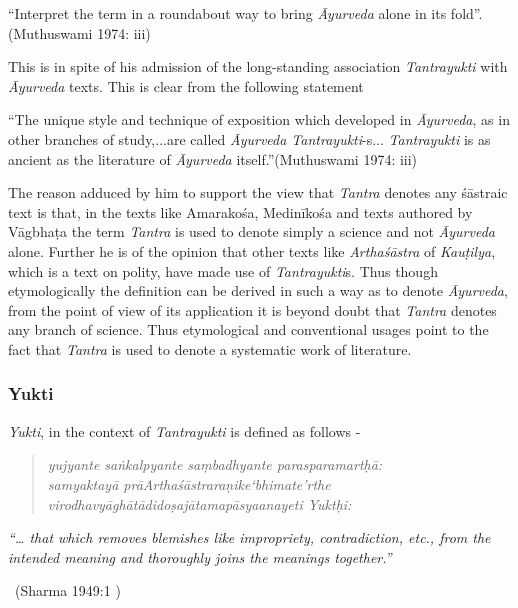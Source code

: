 \begin{myquote}
“Interpret the term in a roundabout way to bring \textit{Āyurveda} alone in its fold”.\hfill (Muthuswami 1974: iii)
\end{myquote}

This is in spite of his admission of the long-standing association \textit{Tantrayukti} with \textit{Āyurveda} texts. This is clear from the following statement 

“The unique style and technique of exposition which developed in \textit{Āyurveda}, as in other branches of study,...are called \textit{Āyurveda Tantrayukti}-s... \textit{Tantrayukti} is as ancient as the literature of \textit{Āyurveda} itself.”\hfill (Muthuswami 1974: iii)

The reason adduced by him to support the view that \textit{Tantra} denotes any śāstraic text is that, in the texts like Amarakośa, Medinīkośa and texts authored by Vāgbhaṭa the term \textit{Tantra} is used to denote simply a science and not \textit{Āyurveda} alone. Further he is of the opinion that other texts like \textit{Arthaśāstra} of \textit{Kauṭilya}, which is a text on polity, have made use of \textit{Tantrayukti}s. Thus though etymologically the definition can be derived in such a way as to denote \textit{Āyurveda}, from the point of view of its application it is beyond doubt that \textit{Tantra} denotes any branch of science. Thus etymological and conventional usages point to the fact that \textit{Tantra} is used to denote a systematic work of literature.


\subsubsection*{Yukti}

\textit{Yukti}, in the context of \textit{Tantrayukti} is defined as follows -

\begin{verse}
\textit{yujyante saṅkalpyante saṃbadhyante parasparamartḥā:}\\\textit{samyaktayā prāArthaśāstraraṇike‘bhimate’rthe}\\\textit{virodhavyāghātādidoṣajātamapāsyaanayeti Yuktḥi:}
\end{verse}

\begin{myquote}
\textit{“… that which removes blemishes like impropriety, contradiction, etc., from the intended meaning and thoroughly joins the meanings together.”}

~\hfill (Sharma 1949:1 )
\end{myquote}

